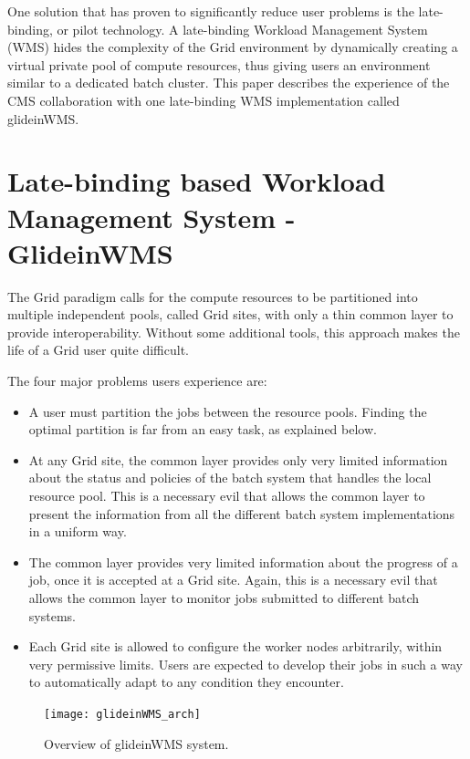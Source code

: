 \documentclass[a4paper]{jpconf}
\begin{document}
One solution that has proven to significantly reduce user problems is the late-binding, or pilot technology.  
A late-binding Workload Management System (WMS) hides the complexity of the Grid environment by dynamically creating 
a virtual private pool of compute resources, thus giving users an environment similar to a dedicated batch cluster.
This paper describes the experience of the CMS collaboration with one late-binding WMS implementation called glideinWMS. 
\section{Late-binding based Workload Management System - GlideinWMS }
The Grid paradigm calls for the compute resources to be partitioned into multiple independent pools, called Grid sites,
with only a thin common layer to provide interoperability.
Without some additional tools, this approach makes the life of a Grid user quite difficult. 

The four major problems users experience are:
\begin {itemize}
\item 
A user must partition the jobs between the resource pools.
Finding the optimal partition is far from an easy task, as explained below.
\item
At any Grid site, the common layer provides only very limited information about the status and policies of the
batch system that handles the local resource pool.
This is a necessary evil that allows the common layer to present the information from all the different batch system 
implementations in a uniform way. 
\item 
The common layer provides very limited information about the progress of a job, once it is accepted at a Grid site.
Again, this is a necessary evil that allows the common layer to monitor jobs submitted to different batch systems.  
\item
Each Grid site is allowed to configure the worker nodes arbitrarily, within very permissive limits.
Users are expected to develop their jobs in such a way to automatically adapt to any condition they encounter.
\end{itemize}
\begin{figure}
\begin{center}
\texttt{[image: glideinWMS\_arch]}
\end{center}
\caption{Overview of glideinWMS system.}
\label{fig:glideinWMS}
\end{figure}
\end{document}
